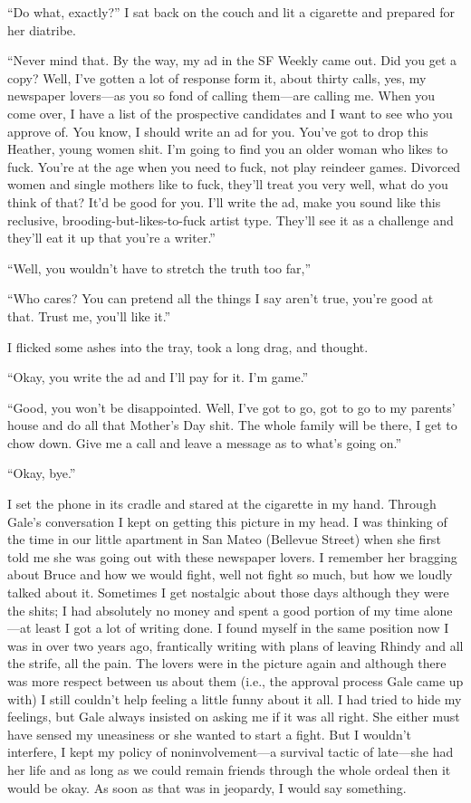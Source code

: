 ``Do what, exactly?'' I sat back on the couch and lit a cigarette and
prepared for her diatribe.

``Never mind that. By the way, my ad in the SF Weekly came out. Did you
get a copy? Well, I've gotten a lot of response form it, about thirty
calls, yes, my newspaper lovers---as you so fond of calling them---are
calling me. When you come over, I have a list of the prospective
candidates and I want to see who you approve of. You know, I should
write an ad for you. You've got to drop this Heather, young women shit.
I'm going to find you an older woman who likes to fuck. You're at the
age when you need to fuck, not play reindeer games. Divorced women and
single mothers like to fuck, they'll treat you very well, what do you
think of that? It'd be good for you. I'll write the ad, make you sound
like this reclusive, brooding-but-likes-to-fuck artist type. They'll see
it as a challenge and they'll eat it up that you're a writer.''

``Well, you wouldn't have to stretch the truth too far,''

``Who cares? You can pretend all the things I say aren't true, you're
good at that. Trust me, you'll like it.''

I flicked some ashes into the tray, took a long drag, and thought.

``Okay, you write the ad and I'll pay for it. I'm game.''

``Good, you won't be disappointed. Well, I've got to go, got to go to my
parents' house and do all that Mother's Day shit. The whole family will
be there, I get to chow down. Give me a call and leave a message as to
what's going on.''

``Okay, bye.''

I set the phone in its cradle and stared at the cigarette in my hand.
Through Gale's conversation I kept on getting this picture in my head. I
was thinking of the time in our little apartment in San Mateo (Bellevue
Street) when she first told me she was going out with these newspaper
lovers. I remember her bragging about Bruce and how we would fight, well
not fight so much, but how we loudly talked about it. Sometimes I get
nostalgic about those days although they were the shits; I had
absolutely no money and spent a good portion of my time alone---at least
I got a lot of writing done. I found myself in the same position now I
was in over two years ago, frantically writing with plans of leaving
Rhindy and all the strife, all the pain. The lovers were in the picture
again and although there was more respect between us about them (i.e.,
the approval process Gale came up with) I still couldn't help feeling a
little funny about it all. I had tried to hide my feelings, but Gale
always insisted on asking me if it was all right. She either must have
sensed my uneasiness or she wanted to start a fight. But I wouldn't
interfere, I kept my policy of noninvolvement---a survival tactic of
late---she had her life and as long as we could remain friends through
the whole ordeal then it would be okay. As soon as that was in jeopardy,
I would say something.

